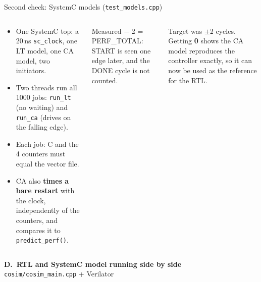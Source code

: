 \documentclass[aspectratio=169,11pt]{beamer}
\newcommand{\file}[1]{\texttt{\textcolor{copper}{#1}}}
\newcommand{\sig}[1]{\texttt{#1}}
\begin{document}
\begin{frame}{Second check: SystemC models (\file{test\_models.cpp})}
  \begin{columns}[T]
    \begin{how}
      \begin{itemize}
        \item One SystemC top: a 20\,ns \sig{sc\_clock}, one LT model, one CA model, two initiators.
        \item Two threads run all 1000 jobs: \sig{run\_lt} (no waiting) and \sig{run\_ca}
              (drives on the falling edge).
        \item Each job: C and the 4 counters must equal the vector file.
        \item CA also \textbf{times a bare restart} with the clock, independently of the counters,
              and compares it to \sig{predict\_perf()}.
      \end{itemize}
    \end{how}
    \scriptsize\color{muted} Measured $-$ 2 = PERF\_TOTAL: START is seen one edge later, and the
    DONE cycle is not counted.
    \centering\small
    \\[3mm]
    \begin{why}
      Target was $\pm$2 cycles. Getting \textbf{0} shows the CA model reproduces the controller
      exactly, so it can now be used as the reference for the RTL.
    \end{why}
  \end{columns}
\end{frame}

\begin{frame}
  \centering\vspace{10mm}
  {\Large\bfseries\color{pcb} D.\ RTL and SystemC model running side by side}\\[4mm]
  \color{muted} \file{cosim/cosim\_main.cpp} + Verilator
\end{frame}
\end{document}
